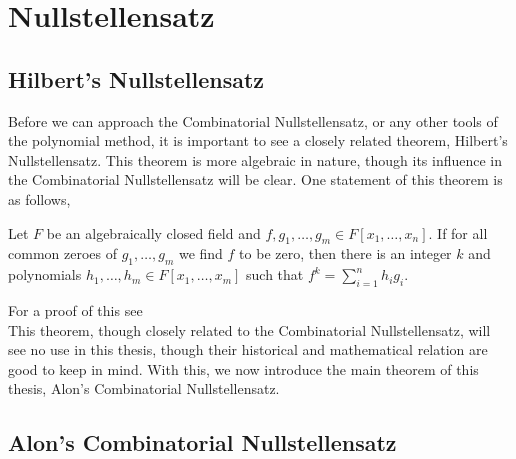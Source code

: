 \chapter{Nullstellensatz}
\section{Hilbert's Nullstellensatz}
Before we can approach the Combinatorial Nullstellensatz, or any other tools of the polynomial method, it is important to see a closely related theorem, Hilbert's Nullstellensatz. This theorem is more algebraic in nature, though its influence in the Combinatorial Nullstellensatz will be clear. One statement of this theorem is as follows,
\begin{theorem}
 Let \(F\) be an algebraically closed field and \(f, g_1, \ldots, g_{m} \in F\left[ x_1, \ldots, x_{n} \right] \). If for all common zeroes of \(g_1, \ldots, g_{m}\) we find \(f\) to be zero, then there is an integer \(k\) and polynomials \(h_1, \ldots, h_{m} \in F\left[ x_1, \ldots, x_{m} \right] \)  such that \(f^{k} = \sum_{i= 1}^{n} h_{i}g_{i}\).
\end{theorem}
For a proof of this see \\
This theorem, though closely related to the Combinatorial Nullstellensatz, will see no use in this thesis, though their historical and mathematical relation are good to keep in mind. With this, we now introduce the main theorem of this thesis, Alon's Combinatorial Nullstellensatz.\newpage
	\section{Alon's Combinatorial Nullstellensatz}

